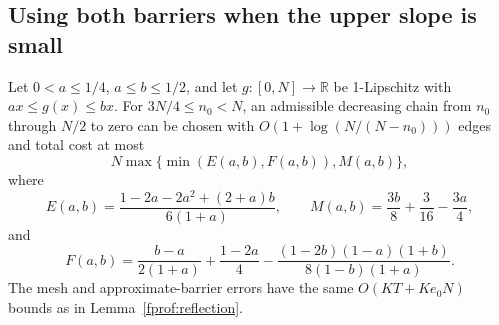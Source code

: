 \subsection{Using both barriers when the upper slope is small}

\begin{lemma}\label{fprof:smallslope}
Let \(0<a\le1/4\), \(a\le b\le1/2\), and let
\(g:[0,N]\to\mathbb R\) be 1-Lipschitz with \(ax\le g(x)\le bx\).
For \(3N/4\le n_0<N\), an admissible decreasing chain from \(n_0\)
through \(N/2\) to zero can be chosen with
\(O(1+\log(N/(N-n_0)))\) edges and total cost at most
$$
 N\max\{\min(E(a,b),F(a,b)),M(a,b)\},
$$
where
$$
 E(a,b)=\frac{1-2a-2a^2+(2+a)b}{6(1+a)},\qquad
 M(a,b)=\frac{3b}{8}+\frac3{16}-\frac{3a}{4},
$$
and
\begin{equation}\label{fprof:small-F}
 F(a,b)=\frac{b-a}{2(1+a)}+\frac{1-2a}{4}
 -\frac{(1-2b)(1-a)(1+b)}{8(1-b)(1+a)}.
\end{equation}
The mesh and approximate-barrier errors have the same
\(O(KT+Ke_0N)\) bounds as in Lemma~\ref{fprof:reflection}.
\end{lemma}


